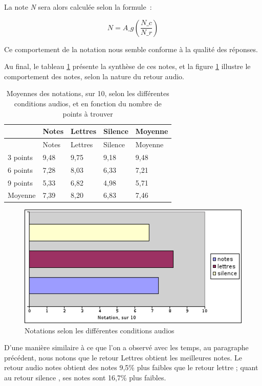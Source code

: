 \documentclass[
]{book}
\begin{document}
La note \emph{N} sera alors calculée selon la formule~:

\[
N=A\_{g}\left(\frac{N\_{c}}{N\_{r}}\right)\]

Ce comportement de la notation nous semble conforme à la qualité des
réponses.

Au final, le tableau \ref{tab:moyennesaudio}
présente la synthèse de ces notes, et la figure \ref{fig:notations2} illustre
le comportement des notes, selon la nature du retour audio.

\begin{longtable}[]{@{}lllll@{}}
\caption{\label{tab:moyennesaudio} Moyennes des notations, sur 10,
selon les différentes conditions audios, et en fonction du nombre de
points à trouver}\tabularnewline
\toprule()
& Notes & Lettres & Silence & Moyenne \\
\midrule()
\endfirsthead
\toprule()
& Notes & Lettres & Silence & Moyenne \\
\midrule()
\endhead
3 points & 9,48 & 9,75 & 9,18 & 9,48 \\
6 points & 7,28 & 8,03 & 6,33 & 7,21 \\
9 points & 5,33 & 6,82 & 4,98 & 5,71 \\
Moyenne & 7,39 & 8,20 & 6,83 & 7,46 \\
\bottomrule()
\end{longtable}

\begin{figure}
\centering
\includegraphics{img/res_loc_notes.png}
\caption{\label{fig:notations2}Notations selon les différentes conditions
audios}
\end{figure}

D'une manière similaire à ce que l'on a observé avec les temps, au
paragraphe précédent, nous notons que le retour Lettres obtient les
meilleures notes. Le retour audio notes obtient des notes 9,5\% plus faibles
que le retour lettre ; quant au retour silence , ses notes sont 16,7\% plus
faibles.
\end{document}
